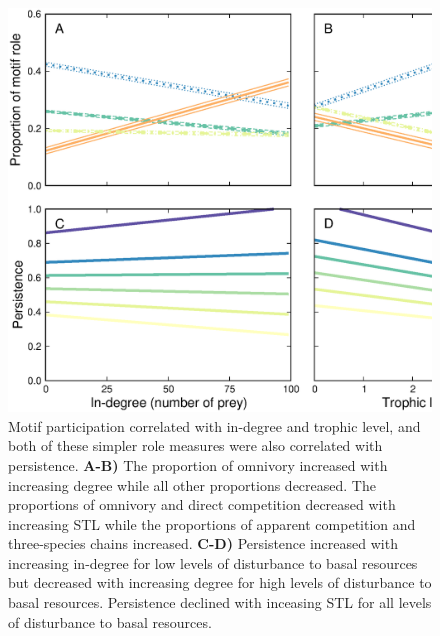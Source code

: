 \documentclass[12pt]{article}
\begin{document}
\begin{spacing}{2.0}
    \begin{figure}
        \centering
        \includegraphics[width=\textwidth]{figures/roles_vs_TL.eps}
        \caption{Motif participation correlated with in-degree and trophic level, and both of these simpler role measures were also correlated with persistence. \textbf{A-B)} The proportion of omnivory increased with increasing degree while all other proportions decreased. The proportions of omnivory and direct competition decreased with increasing STL while the proportions of apparent competition and three-species chains increased. \textbf{C-D)} Persistence increased with increasing in-degree for low levels of disturbance to basal resources but decreased with increasing degree for high levels of disturbance to basal resources.
        Persistence declined with inceasing STL for all levels of disturbance to basal resources.}
        \label{fig:motifs_vs_TL_and_deg}
    \end{figure}        


\end{spacing}
\end{document}

